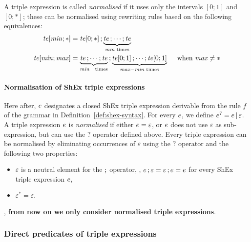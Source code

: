A \stshex triple expression is called \emph{normalised} if it uses only the
intervals $[0; 1]$ and $[0; *]$; these can be normalised using rewriting rules
based on the following equivalences:
\begin{align*}
  \mathit{te}[\mathit{min};*]
& =
  \mathit{te}[0;*] \mathop{;} \underbrace{\mathit{te} \mathop{;} \cdots \mathop{;}
  \mathit{te}}_{\mathit{min} \text{ times}}
\\
  \mathit{te}[\mathit{min};\mathit{max}]
& =
  \underbrace{\mathit{te} \mathop{;} \cdots \mathop{;} \mathit{te}}_{\mathit{min} \text{
  times}} \mathop{;} \underbrace{\mathit{te}[0;1] \mathop{;} \cdots \mathop{;}
  \mathit{te}[0;1]}_{\mathit{max}-\mathit{min} \text{ times}} \quad \text{ when }
  \mathit{max} \not= *
\end{align*}


\paragraph{Normalisation of ShEx triple expressions}

Here after, $e$ designates a closed ShEx triple expression derivable from the
rule $f$ of the grammar in Definition~\ref{def:shex-syntax}.
For every $e$, we define $e^{?} = e \mathop{|} \varepsilon$.
A triple expression $e$ is \emph{normalised} if either $e = \varepsilon$,
or $e$ does not use $\varepsilon$ as sub-expression, but can use the $?$
operator defined above.
Every triple expression can be normalised by eliminating occurrences of
$\varepsilon$ using the $?$ operator and the following two properties:
\begin{itemize}
\item
  $\varepsilon$ is a neutral element for the $\mathop{;}$ operator, \ie, $e
  \mathop{;} \varepsilon = \varepsilon \mathop{;} e = e$ for every ShEx
  triple expression $e$,
\item
  $\varepsilon^{*} = \varepsilon$.
\end{itemize}
\Wlogx, \textbf{from now on we only consider normalised triple expressions}.


\subsubsection{Direct predicates of triple expressions}
\label{app:sec-shex-define-preds-of-triple-expr}

